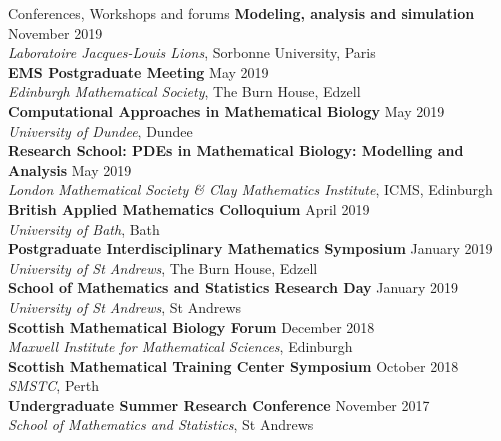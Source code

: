 \documentclass{resume} %
\begin{document}
\begin{rSection}{Conferences, Workshops and forums}
{\bf Modeling, analysis and simulation} \hfill {November 2019} \\
{{\em  Laboratoire Jacques-Louis Lions}, Sorbonne University, Paris} \\
{\bf EMS Postgraduate Meeting} \hfill {May 2019} \\
{{\em  Edinburgh Mathematical Society}, The Burn House, Edzell} \\
{\bf Computational Approaches in Mathematical Biology} \hfill {May 2019} \\
{{\em  University of Dundee}, Dundee} \\
{\bf Research School: PDEs in Mathematical Biology: Modelling and Analysis} \hfill {May 2019} \\
{{\em  London Mathematical Society \& Clay Mathematics Institute}, ICMS, Edinburgh} \\
{\bf British Applied Mathematics Colloquium} \hfill {April 2019} \\
{{\em University of Bath}, Bath} \\
{\bf Postgraduate Interdisciplinary Mathematics Symposium} \hfill {January 2019} \\
{{\em University of St Andrews}, The Burn House, Edzell} \\
{\bf School of Mathematics and Statistics Research Day} \hfill {January 2019} \\
{{\em University of St Andrews}, St Andrews} \\
{\bf Scottish Mathematical Biology Forum} \hfill {December 2018} \\
{{\em Maxwell Institute for Mathematical Sciences}, Edinburgh} \\
{\bf Scottish Mathematical Training Center Symposium} \hfill {October 2018} \\
{{\em SMSTC}, Perth} \\
{\bf Undergraduate Summer Research Conference} \hfill {November 2017} \\
{{\em School of Mathematics and Statistics}, St Andrews} 
\end{rSection}
\end{document}
